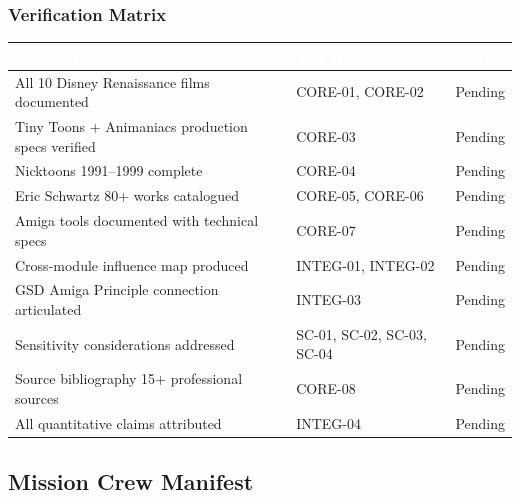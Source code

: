\documentclass[11pt,letterpaper]{article}
\newcommand{\tableheader}[1]{\textbf{\sffamily\textcolor{white}{#1}}}
\begin{document}
\subsubsection{Verification Matrix}

\begin{center}
\begin{tabularx}{\textwidth}{L{5cm}L{3cm}C{2cm}}
\toprule
{}
\tableheader{Success Criterion} & \tableheader{Test IDs} & \tableheader{Status} \\
\midrule
All 10 Disney Renaissance films documented & CORE-01, CORE-02 & Pending \\
Tiny Toons + Animaniacs production specs verified & CORE-03 & Pending \\
Nicktoons 1991--1999 complete & CORE-04 & Pending \\
Eric Schwartz 80+ works catalogued & CORE-05, CORE-06 & Pending \\
Amiga tools documented with technical specs & CORE-07 & Pending \\
Cross-module influence map produced & INTEG-01, INTEG-02 & Pending \\
GSD Amiga Principle connection articulated & INTEG-03 & Pending \\
Sensitivity considerations addressed & SC-01, SC-02, SC-03, SC-04 & Pending \\
Source bibliography 15+ professional sources & CORE-08 & Pending \\
All quantitative claims attributed & INTEG-04 & Pending \\
\bottomrule
\end{tabularx}
\end{center}

\subsection{Mission Crew Manifest}
\end{document}
